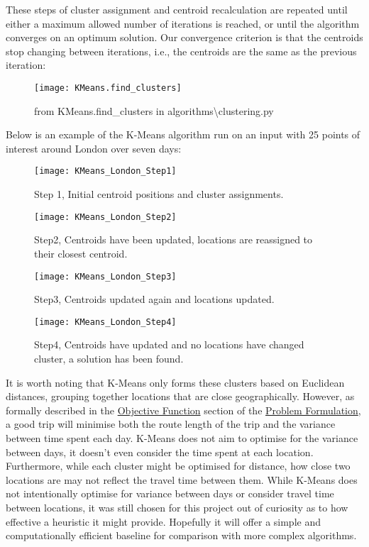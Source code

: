 \noindent
These steps of cluster assignment and centroid recalculation are repeated until either a maximum allowed number of
iterations is reached, or until the algorithm converges on an optimum solution.
Our convergence criterion is that the centroids stop changing between iterations, i.e., the centroids are the same
as the previous iteration:
\begin{figure}[H]\label{fig:KMeans.find_clusters}
    \centering
    \texttt{[image: KMeans.find\_clusters]}
    \caption{from KMeans.find\_clusters in algorithms\textbackslash clustering.py}
\end{figure}

\noindent
Below is an example of the K-Means algorithm run on an input with 25 points of interest around London over seven days:
\begin{figure}[H]\label{fig:KMeans_London_Step1}
    \ContinuedFloat*
    \texttt{[image: KMeans\_London\_Step1]}
    \caption{Step 1, Initial centroid positions and cluster assignments.}
\end{figure}
\begin{figure}[H]\label{fig:KMeans_London_Step2}
    \ContinuedFloat
    \texttt{[image: KMeans\_London\_Step2]}
    \caption{Step2, Centroids have been updated, locations are reassigned to their closest centroid.}
\end{figure}
\begin{figure}[H]\label{fig:KMeans_London_Step3}
    \ContinuedFloat
    \texttt{[image: KMeans\_London\_Step3]}
    \caption{Step3, Centroids updated again and locations updated.}
\end{figure}
\begin{figure}[H]\label{fig:KMeans_London_Step4}
    \ContinuedFloat
    \texttt{[image: KMeans\_London\_Step4]}
    \caption{Step4, Centroids have updated and no locations have changed cluster, a solution has been found.}
\end{figure}

\noindent
It is worth noting that K-Means only forms these clusters based on Euclidean distances, grouping together locations
that are close geographically.
However, as formally described in the \hyperref[subsec:objective-function]{Objective Function} section of the
\hyperref[sec:problem-formulation]{Problem Formulation}, a good trip will minimise both the route length of the trip
and the variance between time spent each day.
K-Means does not aim to optimise for the variance between days, it doesn't even consider the time spent at each
location.
Furthermore, while each cluster might be optimised for distance, how close two locations are may not reflect the travel
time between them.
While K-Means does not intentionally optimise for variance between days or consider travel time between locations, it
was still chosen for this project out of curiosity as to how effective a heuristic it might provide.
Hopefully it will offer a simple and computationally efficient baseline for comparison with more complex
algorithms.

